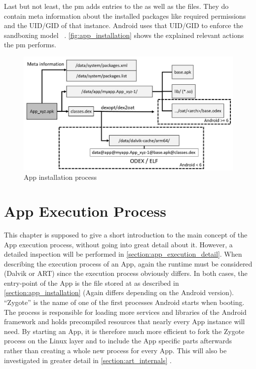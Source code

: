 Last but not least, the pm adds entries to the
 as well as the
 files. They do contain
meta information about the installed packages like
required permissions and the UID/GID of that instance.
Android uses that UID/GID to enforce the sandboxing model
~\parencite[ch.1]{securityinternals}.
\autoref{fig:app_installation} shows the explained
relevant actions the pm performs.

\begin{figure}[htb]
  \includegraphics[width=\textwidth]{figures/app_installation}
  \caption[App installation process]{App installation process}
  \label{fig:app_installation}
\end{figure}

\section{App Execution Process}\label{section:app_execution_simple}
This chapter is supposed to give a short introduction to the
main concept of the App execution process, without going into
great detail about it. However, a detailed inspection will
be performed in \autoref{section:app_execution_detail}.
When describing the execution process of an App, again the
runtime must be considered (Dalvik or ART) since the execution process
obviously differs. In both cases, the entry-point of the App is the
file stored at  as described in
\autoref{section:app_installation} (Again differs depending on the Android version).
``Zygote'' is
the name of one of the first processes Android starts when booting.
The process is responsible for loading more services and libraries
of the Android framework and holds precompiled resources that
nearly every App instance will need.
By starting an App, it is therefore much more efficient to fork
the Zygote process on the Linux layer and to include the App specific parts afterwards rather than creating a whole new process for every App.
This will also be investigated in greater detail in \autoref{section:art_internals} \parencite[ch.2]{hackershandbook}.

